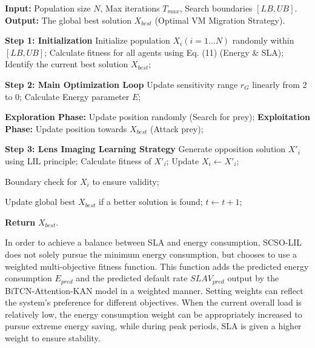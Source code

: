 \documentclass[conference]{{IEEEtran}}
\begin{document}
\begin{algorithm}[!t] 
\caption{Improved SCSO Algorithm with Lens Imaging Learning (LIL)}
\label{alg:scso_lil}
\begin{algorithmic}[1]
\State \textbf{Input:} Population size $N$, Max iterations $T_{max}$, Search boundaries $[LB, UB]$.
\State \textbf{Output:} The global best solution $X_{best}$ (Optimal VM Migration Strategy).

\State \textbf{Step 1: Initialization}
\State Initialize population $X_i (i=1...N)$ randomly within $[LB, UB]$;
\State Calculate fitness for all agents using Eq. (11) (Energy \& SLA);
\State Identify the current best solution $X_{best}$;

\State \textbf{Step 2: Main Optimization Loop}
    \State Update sensitivity range $r_G$ linearly from 2 to 0;
        \State Calculate Energy parameter $E$; 
        
            \State \textbf{Exploration Phase:} Update position randomly (Search for prey);
        \Else
            \State \textbf{Exploitation Phase:} Update position towards $X_{best}$ (Attack prey);
        \EndIf
        
        \State \textbf{Step 3: Lens Imaging Learning Strategy}
        \State Generate opposition solution $X'_{i}$ using LIL principle;
        \State Calculate fitness of $X'_{i}$;
            \State Update $X_{i} \leftarrow X'_{i}$; 
        \EndIf
        
        \State Boundary check for $X_i$ to ensure validity;
    \EndFor
    
    \State Update global best $X_{best}$ if a better solution is found;
    \State $t \leftarrow t + 1$;
\EndWhile

\State \textbf{Return} $X_{best}$.
\end{algorithmic}
\end{algorithm}

In order to achieve a balance between SLA and energy consumption, SCSO-LIL does not solely pursue the minimum energy consumption, but chooses to use a weighted multi-objective fitness function. This function adds the predicted energy consumption $E_{pred}$ and the predicted default rate $SLAV_{pred}$ output by the BiTCN-Attention-KAN model in a weighted manner\cite{xu2024kolmogorov}. Setting weights can reflect the system's preference for different objectives. When the current overall load is relatively low, the energy consumption weight can be appropriately increased to pursue extreme energy saving, while during peak periods, SLA is given a higher weight to ensure stability.
\end{document}
